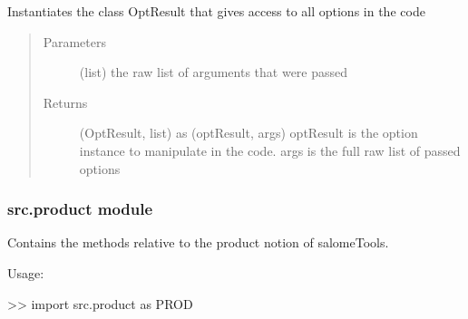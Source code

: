 \documentclass[a4paper,10pt,english]{sphinxmanual}
\begin{document}
\begin{fulllineitems}
\begin{fulllineitems}
\end{fulllineitems}


\begin{fulllineitems}
\label{\detokenize{apidoc_src/src:src.options.Options.parse_args}}
Instantiates the class OptResult 
that gives access to all options in the code
\begin{quote}\begin{description}
\item[{Parameters}] \leavevmode
{} \textendash{} (list) the raw list of arguments that were passed

\item[{Returns}] \leavevmode
(OptResult, list) as (optResult, args) 
optResult is the option instance to manipulate in the code. 
args is the full raw list of passed options

\end{description}\end{quote}

\end{fulllineitems}


\end{fulllineitems}



\subsubsection{src.product module}
\label{\detokenize{apidoc_src/src:module-src.product}}\label{\detokenize{apidoc_src/src:src-product-module}}
Contains the methods 
relative to the product notion of salomeTools.

\begin{DUlineblock}{0em}
\item[] Usage:
\item[] \textgreater{}\textgreater{} import src.product as PROD
\end{DUlineblock}
\end{document}
